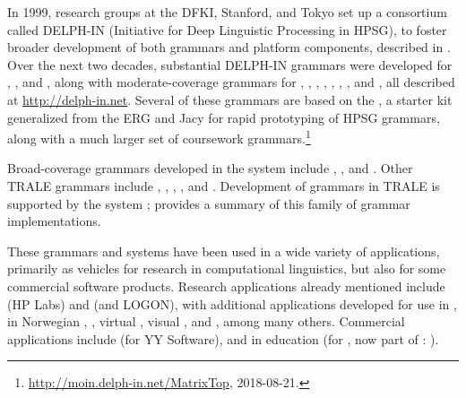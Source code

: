 \documentclass[output=paper]{langsci/langscibook}
\begin{document}
In 1999, research groups at the DFKI, Stanford, and Tokyo set up a consortium called DELPH-IN (Initiative for Deep Linguistic Processing in HPSG), to foster broader development of both grammars and platform components, described in \citet*{OFTU2002a-ed}.  Over the next two decades, substantial DELPH-IN grammars were developed for , , and , along with moderate-coverage grammars for , , , , , , , and , all described at \url{http://delph-in.net}.  Several of these grammars are based on the  \citep*{BFO2002a-u}, a starter kit generalized from the ERG and Jacy for rapid prototyping of HPSG grammars, along with a much larger set of coursework grammars.\footnote{\url{http://moin.delph-in.net/MatrixTop}, 2018-08-21.} 

Broad-coverage grammars developed in the  system \citep{MPR2002a-u,Penn2004a-u} include  \citep{MuellerLehrbuch1},  \citep{MOeDanish-language}, and  \citep{MuellerPersian}. Other TRALE grammars include
 \citep{ML2013a},  \citep{Abzianidze2011a-u},  \citep{MuellerMalteseSketch},  \citep{Machicao-y-Priemer2015a}, and  \citep{MOe2011a}. Development of grammars in TRALE is supported by the  system \citep{MuellerGrammix}; \citet{MuellerCoreGram} provides a summary of this family of grammar implementations.

These grammars and systems have been used in a wide variety of applications, primarily as vehicles for research in computational linguistics, but also for some commercial software products.  Research applications already mentioned include  (HP Labs) and  (\verbmobil and LOGON), with additional applications developed for use in  \citep*{Sch:Kie:Spu:11},  in Norwegian \citep*{Hellanetal:13},  \citep{Herb:Cope:06}, virtual  \citep{packard2014uw}, visual  \citep{DBLP:journals/corr/KuhnleC17}, and  \citep{Flickinger:17}, among many others.  Commercial applications include  (for YY Software), and  in education (for , now part of : \citet*{Suppesetal:12}).
\end{document}
